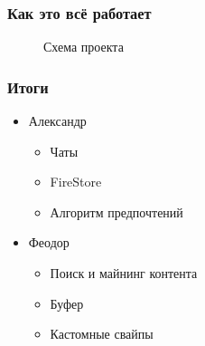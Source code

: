 \documentclass[xetex,mathserif,serif]{beamer}
\begin{document}
	\begin{frame}
		\frametitle{Как это всё работает}
		\begin{figure}[h]
            \caption{Схема проекта}
            \label{fig:image}
        \end{figure}
	\end{frame}	
	
	\begin{frame}
		\frametitle{Итоги}
		\begin{itemize}
			\item Александр
			    \begin{itemize}
			    	\item Чаты
			    	\item FireStore
			    	\item Алгоритм предпочтений
		        \end{itemize}
			\item Феодор
			    \begin{itemize}
			    	\item Поиск и майнинг контента
			    	\item Буфер  
			    	\item Кастомные свайпы
		        \end{itemize}
		\end{itemize}
	\end{frame}
\end{document}
